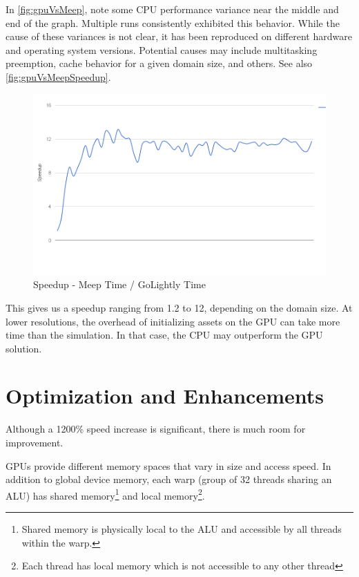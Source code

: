In \autoref{fig:gpuVsMeep}, note some CPU performance variance near the middle and end of the graph. Multiple runs consistently exhibited this behavior. While the cause of these variances is not clear, it has been reproduced on different hardware and operating system versions. Potential causes may include multitasking preemption, cache behavior for a given domain size, and others. See also \autoref{fig:gpuVsMeepSpeedup}.

\begin{figure}[H]
	\centering
	\includegraphics[width=\textwidth,
	keepaspectratio]{gpu-vs-meep-speedup.png}
	\caption{Speedup - Meep Time / GoLightly Time}
	\label{fig:gpuVsMeepSpeedup}
\end{figure}

This gives us a speedup ranging from 1.2 to 12, depending on the domain size. At lower resolutions, the overhead of initializing assets on the GPU can take more time than the simulation. In that case, the CPU may outperform the GPU solution.

\section{Optimization and Enhancements}

Although a 1200\% speed increase is significant, there is much room for improvement. 

GPUs provide different memory spaces that vary in size and access speed. In addition to global device memory, each warp (group of 32 threads sharing an ALU) has shared memory\footnote{Shared memory is physically local to the ALU and accessible by all threads within the warp.} and local memory\footnote{Each thread has local memory which is not accessible to any other thread}.

